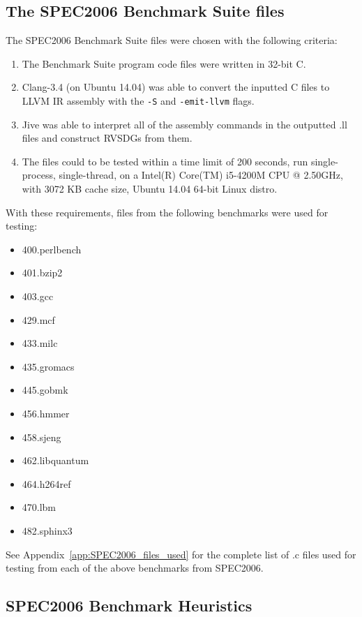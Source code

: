 \subsection{The SPEC2006 Benchmark Suite files}
\label{sub:scheme:SPEC2006_files}

The SPEC2006 Benchmark Suite files were chosen with the following criteria:

\begin{enumerate}
	\item The Benchmark Suite program code files were written in 32-bit C.

	\item Clang-3.4 (on Ubuntu 14.04) was able to convert the inputted C files
to LLVM IR assembly with the \lstinline!-S! and \lstinline!-emit-llvm! flags.

	\item Jive was able to interpret all of the assembly commands in the
outputted .ll files and construct RVSDGs from them.

	\item The files could to be tested within a time limit of 200 seconds, run
single-process, single-thread, on a Intel(R) Core(TM) i5-4200M CPU @ 2.50GHz,
with 3072 KB cache size, Ubuntu 14.04 64-bit Linux distro.
\end{enumerate}


With these requirements, files from the following benchmarks were used for
testing:

\begin{multicols}{4}
	\begin{itemize}
		\item 400.perlbench
		\item 401.bzip2
		\item 403.gcc
		\item 429.mcf
		\item 433.milc
		\item 435.gromacs
		\item 445.gobmk
		\item 456.hmmer
		\item 458.sjeng
		\item 462.libquantum
		\item 464.h264ref
		\item 470.lbm
		\item 482.sphinx3
	\end{itemize}
\end{multicols}

See Appendix~\ref{app:SPEC2006_files_used} for the complete list of .c files
used for testing from each of the above benchmarks from SPEC2006.

\subsection{SPEC2006 Benchmark Heuristics}
\label{sub:scheme:SPEC2006_heuristics}


